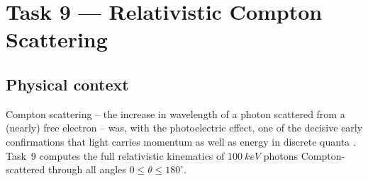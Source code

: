 \documentclass[11pt]{article}
\begin{document}
\section{Task 9 --- Relativistic Compton Scattering}
\label{sec:task9}

\subsection{Physical context}
Compton scattering -- the increase in wavelength of a photon scattered from a (nearly) free electron -- was, with the photoelectric effect, one of the decisive early confirmations that light carries momentum as well as energy in discrete quanta \cite{compton1923}. Task~9 computes the full relativistic kinematics of $\SI{100}{keV}$ photons Compton-scattered through all angles $0\le\theta\le180^\circ$.
\end{document}
